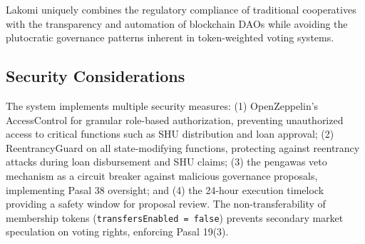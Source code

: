 \documentclass[conference]{IEEEtran}
\begin{document}
\begin{table}[htbp]
\centering
\caption{Comparison of Cooperative Systems}
\label{tab:comparison}
\end{table}

Lakomi uniquely combines the regulatory compliance of traditional cooperatives with the transparency and automation of blockchain DAOs while avoiding the plutocratic governance patterns inherent in token-weighted voting systems.

\subsection{Security Considerations}

The system implements multiple security measures: (1) OpenZeppelin's AccessControl for granular role-based authorization, preventing unauthorized access to critical functions such as SHU distribution and loan approval; (2) ReentrancyGuard on all state-modifying functions, protecting against reentrancy attacks during loan disbursement and SHU claims; (3) the pengawas veto mechanism as a circuit breaker against malicious governance proposals, implementing Pasal 38 oversight; and (4) the 24-hour execution timelock providing a safety window for proposal review. The non-transferability of membership tokens (\texttt{transfersEnabled = false}) prevents secondary market speculation on voting rights, enforcing Pasal 19(3).
\end{document}
